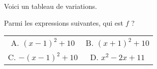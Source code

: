 

Voici un tableau de variations.



Parmi les expressions suivantes, qui est $f$ ?
\begin{tabular}{cc}
A. $(x-1)^2+10$ & B. $(x+1)^2+10$\\
C. $-(x-1)^2+10$ & D. $x^2-2x+11$ \\ 
\end{tabular} 